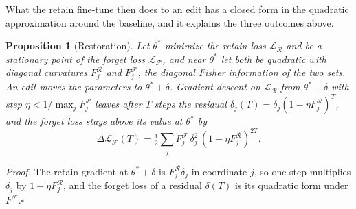 \documentclass{article}
\newtheorem{proposition}{Proposition}
\begin{document}
What the retain fine-tune then does to an edit has a closed form in the quadratic approximation around the baseline, and it explains the three outcomes above.
\begin{proposition}[Restoration]
\label{prop:restoration}
Let $\theta^*$ minimize the retain loss $\mathcal{L}_{\mathcal{R}}$ and be a stationary point of the forget loss $\mathcal{L}_{\mathcal{F}}$, and near $\theta^*$ let both be quadratic with diagonal curvatures $F^{\mathcal{R}}_j$ and $F^{\mathcal{F}}_j$, the diagonal Fisher information of the two sets. An edit moves the parameters to $\theta^* + \delta$. Gradient descent on $\mathcal{L}_{\mathcal{R}}$ from $\theta^* + \delta$ with step $\eta < 1/\max_j F^{\mathcal{R}}_j$ leaves after $T$ steps the residual $\delta_j(T) = \delta_j (1 - \eta F^{\mathcal{R}}_j)^T$, and the forget loss stays above its value at $\theta^*$ by
\begin{equation}
\Delta \mathcal{L}_{\mathcal{F}}(T) = \tfrac{1}{2} \sum_j F^{\mathcal{F}}_j\, \delta_j^2\, (1 - \eta F^{\mathcal{R}}_j)^{2T}.
\label{eq:restoration}
\end{equation}
\end{proposition}
\textit{Proof.} The retain gradient at $\theta^* + \delta$ is $F^{\mathcal{R}}_j \delta_j$ in coordinate $j$, so one step multiplies $\delta_j$ by $1 - \eta F^{\mathcal{R}}_j$, and the forget loss of a residual $\delta(T)$ is its quadratic form under $F^{\mathcal{F}}$.\hfill$\square$
\end{document}
